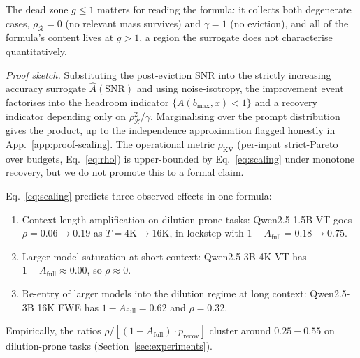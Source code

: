 The dead zone $g \le 1$ matters for reading the formula: it collects both
degenerate cases, $\rho_{\mathcal{R}} = 0$ (no relevant mass survives) and
$\gamma = 1$ (no eviction), and all of the formula's content lives at
$g > 1$, a region the surrogate does not characterise quantitatively.

\emph{Proof sketch.} Substituting the post-eviction SNR into the strictly
increasing accuracy surrogate $\hat A(\mathrm{SNR})$ and using
noise-isotropy, the improvement event factorises into the headroom
indicator $\{A(b_{\max}, x) < 1\}$ and a recovery indicator depending only
on $\rho_{\mathcal{R}}^2 / \gamma$. Marginalising over the prompt
distribution gives the product, up to the independence approximation
flagged honestly in App.~\ref{app:proof-scaling}. The operational metric
$\rho_{\mathrm{KV}}$ (per-input strict-Pareto over budgets,
Eq.~\eqref{eq:rho}) is upper-bounded by Eq.~\eqref{eq:scaling} under
monotone recovery, but we do not promote this to a formal claim.

Eq.~\eqref{eq:scaling} predicts three observed effects in one formula:
\begin{enumerate}
\item Context-length amplification on dilution-prone tasks: Qwen2.5-1.5B
VT goes $\rho = 0.06 \to 0.19$ as $T = 4\mathrm{K} \to 16\mathrm{K}$, in
lockstep with $1 - A_{\mathrm{full}} = 0.18 \to 0.75$.
\item Larger-model saturation at short context: Qwen2.5-3B 4K VT has
$1 - A_{\mathrm{full}} \approx 0.00$, so $\rho \approx 0$.
\item Re-entry of larger models into the dilution regime at long
context: Qwen2.5-3B 16K FWE has $1 - A_{\mathrm{full}} = 0.62$ and
$\rho = 0.32$.
\end{enumerate}
Empirically, the ratios $\rho / [(1-A_{\mathrm{full}}) \cdot p_{\mathrm{recov}}]$
cluster around $0.25 - 0.55$ on dilution-prone tasks
(Section~\ref{sec:experiments}).

